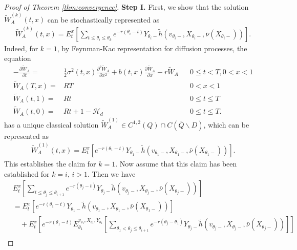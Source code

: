 \documentclass[draft, noinfoline]{ectaart}
\numberwithin{equation}{section}
\theoremstyle{plain}
\begin{document}
\begin{appendices}
\begin{proof}[Proof of Theorem \ref{thm:convergence}]
	{\bf Step I.} First, we show that the solution $\tilde{W}_A^{(k)}(t,x)$ can be stochastically represented as
	\begin{align*}
		\tilde{W}_A^{(k)}(t,x)=E_t^x\left[\sum_{t\le \theta_i\le \theta_k}e^{-r(\theta_i-t)}Y_{\theta_i-}\tilde{h}(v_{\theta_i-},X_{\theta_i-},\bar{\nu}(X_{\theta_i-}))\right].
	\end{align*}
	Indeed, for $k=1$, by Feynman-Kac representation for diffusion processes, the equation
	\begin{align*}
	-\frac{\partial \tilde{W}_{A}}{\partial t}= & \frac{1}{2}\sigma^{2}(t,x)\frac{\partial^{2}\tilde{W}_{A}}{\partial x^{2}}+b(t,x)\frac{\partial \tilde{W}_{A}}{\partial x}-r \tilde{W}_{A} &  & 0\le t<T,0<x<1\\
	\tilde{W}_{A}(T,x)= & RT &  & 0<x<1\\
	\tilde{W}_{A}(t,1)= & Rt&  & 0\le t\le T\\
	\tilde{W}_{A}(t,0)= & Rt+1-\mathcal{H}_{d} &  & 0\le t\le T.
	\end{align*}
	has a unique classical solution $\tilde{W}_A^{(1)}\in C^{1,2}(Q)\cap C(\overline{Q}\backslash D)$, which can be represented as
	\begin{align*}
		\tilde{W}_A^{(1)}(t,x)=E_t^x\left[e^{-r(\theta_1-t)}Y_{\theta_1-}\tilde{h}(v_{\theta_1-},X_{\theta_1-},\bar{\nu}(X_{\theta_1-}))\right].
	\end{align*}
	This establishes the claim for $k=1$. Now assume that this claim has been established for $k=i$, $i>1$. Then we have
	\begin{align*}
		&E_t^x\left[\sum_{t\le \theta_j\le \theta_{i+1}}e^{-r(\theta_j-t)}Y_{\theta_j-}\tilde{h}(v_{\theta_j-},X_{\theta_j-},\bar{\nu}(X_{\theta_j-}))\right]\\
		&=E_t^x\left[e^{-r(\theta_{1}-t)}Y_{\theta_{1}-}\tilde{h}(v_{\theta_{1}-},X_{\theta_{1}-},\bar{\nu}(X_{\theta_{1}-}))\right]\\
		&\quad+E_t^x\left[e^{-r(\theta_1-t)}E_{\theta_1}^{v_{\theta_1},X_{\theta_1},Y_{\theta_1}}\left[\sum_{\theta_1< \theta_j\le \theta_{i+1} }e^{-r(\theta_j-\theta_1)}Y_{\theta_j-}\tilde{h}(v_{\theta_j-},X_{\theta_j-},\bar{\nu}(X_{\theta_j-}))\right]\right]\\

\end{align*}
\end{proof}
\end{appendices}
\end{document}
